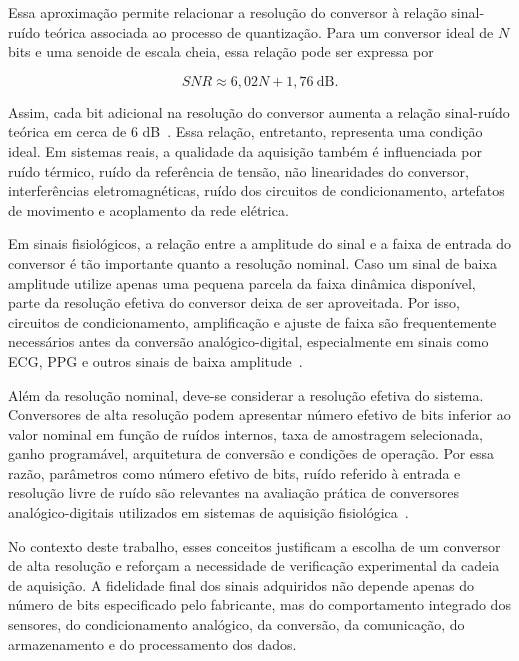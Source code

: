 \documentclass[a4paper,12pt]{fcte}
\begin{document}
\noindent Essa aproximação permite relacionar a resolução do conversor à relação sinal-ruído teórica associada ao processo de quantização. Para um conversor ideal de $N$ bits e uma senoide de escala cheia, essa relação pode ser expressa por

\begin{equation}
    SNR \approx 6,02N + 1,76 \ \text{dB}.
\end{equation}

\noindent Assim, cada bit adicional na resolução do conversor aumenta a relação sinal-ruído teórica em cerca de 6 dB~\cite{kester2008mt001}. Essa relação, entretanto, representa uma condição ideal. Em sistemas reais, a qualidade da aquisição também é influenciada por ruído térmico, ruído da referência de tensão, não linearidades do conversor, interferências eletromagnéticas, ruído dos circuitos de condicionamento, artefatos de movimento e acoplamento da rede elétrica.

Em sinais fisiológicos, a relação entre a amplitude do sinal e a faixa de entrada do conversor é tão importante quanto a resolução nominal. Caso um sinal de baixa amplitude utilize apenas uma pequena parcela da faixa dinâmica disponível, parte da resolução efetiva do conversor deixa de ser aproveitada. Por isso, circuitos de condicionamento, amplificação e ajuste de faixa são frequentemente necessários antes da conversão analógico-digital, especialmente em sinais como ECG, PPG e outros sinais de baixa amplitude~\cite{charlton2022wearable_ppg,raus2025ecg_testing}.

Além da resolução nominal, deve-se considerar a resolução efetiva do sistema. Conversores de alta resolução podem apresentar número efetivo de bits inferior ao valor nominal em função de ruídos internos, taxa de amostragem selecionada, ganho programável, arquitetura de conversão e condições de operação. Por essa razão, parâmetros como número efetivo de bits, ruído referido à entrada e resolução livre de ruído são relevantes na avaliação prática de conversores analógico-digitais utilizados em sistemas de aquisição fisiológica~\cite{kester2008mt001}.

No contexto deste trabalho, esses conceitos justificam a escolha de um conversor de alta resolução e reforçam a necessidade de verificação experimental da cadeia de aquisição. A fidelidade final dos sinais adquiridos não depende apenas do número de bits especificado pelo fabricante, mas do comportamento integrado dos sensores, do condicionamento analógico, da conversão, da comunicação, do armazenamento e do processamento dos dados.
\end{document}
